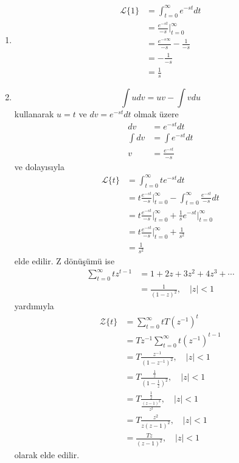 \begin{enumerate}
\item \begin{equation}
    \begin{split}
        \mathcal{L}\{1\}&=\int_{t=0}^{\infty}e^{-st}dt\\
        &=\frac{e^{-st}}{-s}\Bigg|_{t=0}^{\infty}\\
        &=\frac{e^{-s\infty}}{-s}-\frac{1}{-s}\\
        &=-\frac{1}{-s}\\
        &=\frac{1}{s}
    \end{split}
\end{equation}
\item \begin{equation}
    \int udv=uv-\int vdu
\end{equation}
kullanarak $u=t$ ve $dv=e^{-st}dt$ olmak üzere
\begin{equation}
    \begin{split}
        dv&=e^{-st}dt\\
        \int dv&=\int e^{-st}dt\\
        v&=\frac{e^{-st}}{-s}
    \end{split}
\end{equation}
ve dolayısıyla
\begin{equation}
    \begin{split}
        \mathcal{L}\{t\}&=\int_{t=0}^{\infty}t e^{-st}dt\\
        &=t\frac{e^{-st}}{-s}\Bigg|_{t=0}^{\infty}-\int_{t=0}^{\infty}\frac{e^{-st}}{-s}dt\\
        &=t\frac{e^{-st}}{-s}\Bigg|_{t=0}^{\infty}+\frac{1}{s}e^{-st}\Bigg|_{t=0}^{\infty}\\
        &=t\frac{e^{-st}}{-s}\Bigg|_{t=0}^{\infty}+\frac{1}{s^2}\\
        &=\frac{1}{s^2}
    \end{split}
\end{equation}
elde edilir. Z dönüşümü ise
\begin{equation}
    \begin{split}
        \sum_{t=0}^{\infty}t z^{t-1}&=1+2z+3z^2+4z^3+\cdots\\
        &=\frac{1}{(1-z)^2},\quad |z|<1
    \end{split}
\end{equation}
yardımıyla
\begin{equation}
    \begin{split}
        \mathcal{Z}\{t\}&=\sum_{t=0}^{\infty}tT (z^{-1})^{t}\\
        &=Tz^{-1}\sum_{t=0}^{\infty}t (z^{-1})^{t-1}\\
        &=T\frac{z^{-1}}{(1-z^{-1})^2},\quad |z|<1\\
        &=T\frac{\frac{1}{z}}{(1-\frac{1}{z})^2},\quad |z|<1\\
        &=T\frac{\frac{1}{z}}{\frac{(z-1)^2}{z^2}},\quad |z|<1\\
        &=T\frac{z^2}{z(z-1)^2},\quad |z|<1\\
        &=\frac{Tz}{(z-1)^2},\quad |z|<1
    \end{split}
\end{equation}
olarak elde edilir.
\end{enumerate}